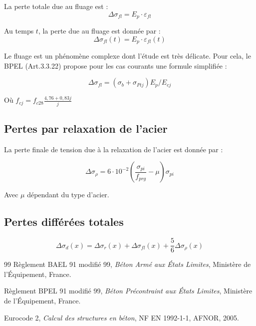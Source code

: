 \documentclass[12pt,a4paper]{article}
\begin{document}
La perte totale due au fluage est :
\begin{equation}
\Delta \sigma_{fl} = E_p \cdot \varepsilon_{fl}
\end{equation}

Au temps $t$, la perte due au fluage est donnée par :
\begin{equation}
\Delta \sigma_{fl}(t) = E_p \cdot \varepsilon_{fl}(t)
\end{equation}

\begin{infobox}
Le fluage est un phénomène complexe dont l'étude est très délicate. Pour cela, le BPEL (Art.3.3.22) propose pour les cas courants une formule simplifiée :

\begin{equation}
\Delta \sigma_{fl} = (\sigma_b + \sigma_{Pij}) E_p / E_{cj}
\end{equation}

Où $f_{cj} = f_{c28} \frac{4,76 + 0,83j}{j}$
\end{infobox}

\subsection{Pertes par relaxation de l'acier}

La perte finale de tension due à la relaxation de l'acier est donnée par :

\begin{equation}
\Delta \sigma_\rho = 6 \cdot 10^{-2} \left( \frac{\sigma_{pi}}{f_{prg}} - \mu \right) \sigma_{pi}
\end{equation}

Avec $\mu$ dépendant du type d'acier.

\subsection{Pertes différées totales}

\begin{equation}
\Delta \sigma_d(x) = \Delta \sigma_r(x) + \Delta \sigma_{fl}(x) + \frac{5}{6} \Delta \sigma_\rho(x)
\end{equation}


\newpage
\begin{thebibliography}{99}
Règlement BAEL 91 modifié 99, \textit{Béton Armé aux États Limites}, Ministère de l'Équipement, France.

Règlement BPEL 91 modifié 99, \textit{Béton Précontraint aux États Limites}, Ministère de l'Équipement, France.

Eurocode 2, \textit{Calcul des structures en béton}, NF EN 1992-1-1, AFNOR, 2005.
\end{thebibliography}
\end{document}
